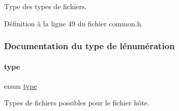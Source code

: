 Type des types de fichiers. 

Définition à la ligne 49 du fichier common.\+h.



\subsubsection{Documentation du type de l\textquotesingle{}énumération}
\mbox{\label{a00047_a7aead736a07eaf25623ad7bfa1f0ee2d}} 
\paragraph{\texorpdfstring{type}{type}}
{\footnotesize\ttfamily enum \hyperlink{a00047_a7aead736a07eaf25623ad7bfa1f0ee2d}{type}}



Types de fichiers possibles pour le fichier hôte. 

